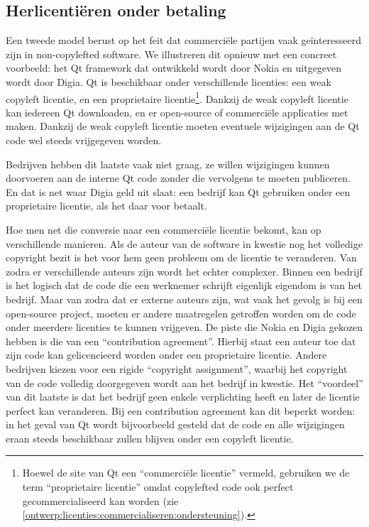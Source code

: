 \subsection{Herlicentiëren onder betaling}
\label{ontwerp:licenties:commercialiseren:herlicentieren}

Een tweede model berust op het feit dat commerciële partijen vaak geïnteresseerd zijn in non-copylefted software. We illustreren dit opnieuw met een concreet voorbeeld: het Qt framework dat ontwikkeld wordt door Nokia en uitgegeven wordt door Digia. Qt is beschikbaar onder verschillende licenties: een weak copyleft licentie, en een proprietaire licentie\footnote{Hoewel de site van Qt een ``commerciële licentie'' vermeld, gebruiken we de term ``proprietaire licentie'' omdat copylefted code ook perfect gecommercialiseerd kan worden (zie \ref{ontwerp:licenties:commercialiseren:ondersteuning}).}. Dankzij de weak copyleft licentie kan iedereen Qt downloaden, en er open-source of commerciële applicaties met maken. Dankzij de weak copyleft licentie moeten eventuele wijzigingen aan de Qt code wel steeds vrijgegeven worden.

Bedrijven hebben dit laatste vaak niet graag, ze willen wijzigingen kunnen doorvoeren aan de interne Qt code zonder die vervolgens te moeten publiceren. En dat is net waar Digia geld uit slaat: een bedrijf kan Qt gebruiken onder een proprietaire licentie, als het daar voor betaalt.

Hoe men net die conversie naar een commerciële licentie bekomt, kan op verschillende manieren. Als de auteur van de software in kwestie nog het volledige copyright bezit is het voor hem geen probleem om de licentie te veranderen. Van zodra er verschillende auteurs zijn wordt het echter complexer. Binnen een bedrijf is het logisch dat de code die een werknemer schrijft eigenlijk eigendom is van het bedrijf. Maar van zodra dat er externe auteurs zijn, wat vaak het gevolg is bij een open-source project, moeten er andere maatregelen getroffen worden om de code onder meerdere licenties te kunnen vrijgeven. De piste die Nokia en Digia gekozen hebben is die van een ``contribution agreement''. Hierbij staat een auteur toe dat zijn code kan gelicencieerd worden onder een proprietaire licentie. Andere bedrijven kiezen voor een rigide ``copyright assignment'', waarbij het copyright van de code volledig doorgegeven wordt aan het bedrijf in kwestie. Het ``voordeel'' van dit laatste is dat het bedrijf geen enkele verplichting heeft en later de licentie perfect kan veranderen. Bij een contribution agreement kan dit beperkt worden: in het geval van Qt wordt bijvoorbeeld gesteld dat de code en alle wijzigingen eraan steeds beschikbaar zullen blijven onder een copyleft licentie.

